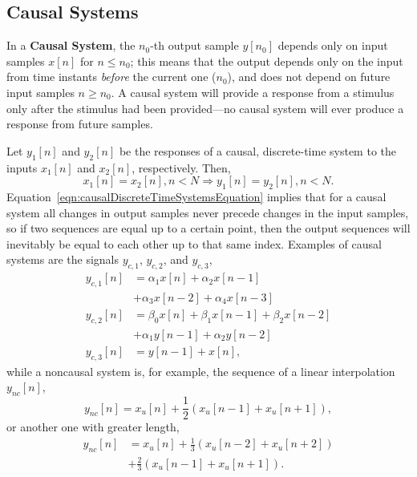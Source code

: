 \documentclass[\documentfontsize, twocolumn]{\classname}
\begin{document}
\subsection{Causal Systems}

In a \textbf{Causal System}, the $n_0$-th output sample $y[n_0]$ depends only on input samples $x[n]$ for $n\leq n_0$; this means that the output depends only on the input from time instants \emph{before} the current one ($n_0$), and does not depend on future input samples $n \geq n_0$. A causal system will provide a response from a stimulus only after the stimulus had been provided---no causal system will ever produce a response from future samples.

Let $y_1[n]$ and $y_2[n]$ be the responses of a causal, discrete-time system to the inputs $x_1[n]$ and $x_2[n]$, respectively. Then, \begin{equation}\label{eqn:causalDiscreteTimeSystemsEquation}x_1[n] = x_2[n], n < N \Longrightarrow y_1[n] = y_2[n], n < N.\end{equation}
Equation~\ref{eqn:causalDiscreteTimeSystemsEquation} implies that for a causal system all changes in output samples never precede changes in the input samples, so if two sequences are equal up to a certain point, then the output sequences will inevitably be equal to each other up to that same index.
Examples of causal systems are the signals $y_{c,1}$, $y_{c,2}$, and $y_{c,3}$,
\begin{align*}
    y_{c,1}[n] &= \alpha_1 x[n] + \alpha_2 x[n-1]\\
               &+ \alpha_3 x[n-2] + \alpha_4 x[n-3]\\
    y_{c,2}[n] &= \beta_0 x[n] + \beta_1 x[n-1] + \beta_2 x[n-2]\\
               &+ \alpha_1 y[n-1] + \alpha_2 y[n-2]\\
    y_{c,3}[n] &= y[n-1] + x[n],
\end{align*}
while a noncausal system is, for example, the sequence of a linear interpolation $y_{nc}[n]$,
\[
    y_{nc}[n] = x_u[n] + \frac 1 2(x_u[n-1] + x_u[n+1]),
\]
or another one with greater length,
\begin{align*}
    y_{nc}[n] &= x_u[n] + \frac 1 3(x_u[n-2] + x_u[n+2])\\
           &+ \frac 2 3(x_u[n-1] + x_u[n+1]).
\end{align*}
\end{document}
